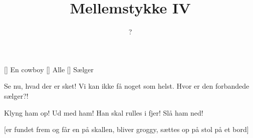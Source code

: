 \documentclass[a4paper,11pt]{article}
\title{Mellemstykke IV}
\author{?}
\begin{document}
\maketitle

\begin{roles}
[] En cowboy
[] Alle
[] Sælger
\end{roles}

\begin{sketch}

   Se nu, hvad der er sket!  Vi kan ikke få noget som helst.
  Hvor er den forbandede sælger?!

    Klyng ham op!  Ud med ham!  Han skal rulles i fjer!  Slå ham ned!

  [er fundet frem og får en på skallen, bliver groggy, sættes
  op på stol på et bord]

\end{sketch}
\end{document}
